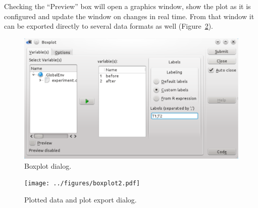 Checking the ``Preview'' box will open a graphics window, show the plot as
it is configured and update the window on changes in real time. From
that window it can be exported directly to several data formats as
well (Figure~\ref{fig:boxplot2}).

\begin{figure}[htp]
 \centering
 \includegraphics[clip=true,width=16cm]{../figures/boxplot1.pdf}
 \caption{Boxplot dialog.}
 \label{fig:boxplot1}
\end{figure}

\begin{figure}[htp]
 \centering
 \texttt{[image: ../figures/boxplot2.pdf]}
 \caption{Plotted data and plot export dialog.}
 \label{fig:boxplot2}
\end{figure}
